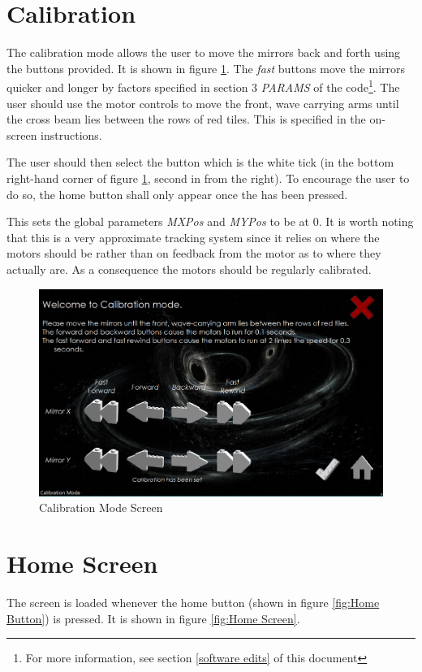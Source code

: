 \documentclass[a4paper, 12pt]{book}
\begin{document}
\section{Calibration}
The calibration mode allows the user to move the mirrors back and forth using the buttons provided. It is shown in figure \ref{fig:Calibration Mode Screen}. The \textit{fast} buttons move the mirrors quicker and longer by factors specified in section 3  \textit{PARAMS} of the code\footnote{For more information, see section \ref{software edits} of this document}. The user should use the motor controls to move the front, wave carrying arms until the cross beam lies between the rows of red tiles. This is specified in the on-screen instructions.

The user should then select the  button which is the white tick (in the bottom right-hand corner of figure \ref{fig:Calibration Mode Screen}, second in from the right). To encourage the user to do so, the home button shall only appear once the  has been pressed.

This sets the global parameters \textit{MXPos} and \textit{MYPos} to be at 0. It is worth noting that this is a very approximate tracking system since it relies on where the motors should be rather than on feedback from the motor as to where they actually are. As a consequence the motors should be regularly calibrated.
\begin{figure}[ht]
\centering
\includegraphics[width=120mm]{Calibration_Screen.png}
\caption{Calibration Mode Screen}
\label{fig:Calibration Mode Screen}
\end{figure}


\section{Home Screen}
The  screen is loaded whenever the home button (shown in figure \ref{fig:Home Button}) is pressed. It is shown in figure \ref{fig:Home Screen}.
\end{document}
